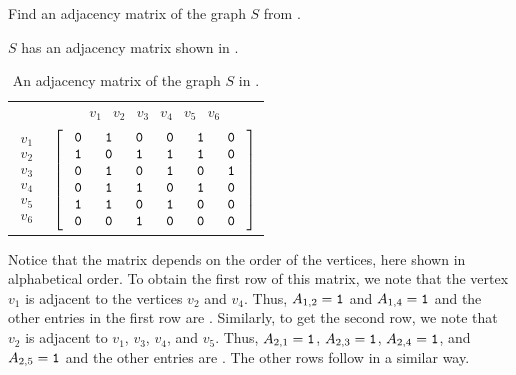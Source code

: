 \begin{exam}
\label{exam_adj_mat}
    Find an adjacency matrix of the graph $S$ from .

            \begin{soln}
                $S$ has an adjacency matrix shown in .  
            
            \begin{table}[hbtp]
                \centering
                \begin{tabular} {cc}
                    & $\begin{array} {cccccc} v_1&v_2&v_3&v_4&v_5&v_6 \end{array}$ \\ 
                    $\begin{array}{r} v_1 \\ v_2 \\ v_3 \\ v_4 \\ v_5 \\ v_6 \end{array}$  
                    & $\left[ \begin{array} {cccccc} 
                    ~\texttt{0}~ & ~\texttt{1}~ & ~\texttt{0}~ & ~\texttt{0}~ & ~\texttt{1}~ & ~\texttt{0}~\\
                    \texttt{1} & \texttt{0} & \texttt{1} & \texttt{1} & \texttt{1} & \texttt{0}\\
                    \texttt{0} & \texttt{1} & \texttt{0} & \texttt{1} & \texttt{0} & \texttt{1}\\
                    \texttt{0} & \texttt{1} & \texttt{1} & \texttt{0} & \texttt{1} & \texttt{0}\\
                    \texttt{1} & \texttt{1} & \texttt{0} & \texttt{1} & \texttt{0} & \texttt{0}\\
                    \texttt{0} & \texttt{0} & \texttt{1} & \texttt{0} & \texttt{0} & \texttt{0}\\
                    \end{array} \right]$ \\
                \end{tabular}
                \caption{An adjacency matrix of the graph $S$ in .}
                \label{table_adj_matrix}
            \end{table}

            Notice that the matrix depends on the order of the vertices, here shown in alphabetical order. To obtain the first row of this matrix, we note that the vertex $v_1$ is adjacent to the vertices $v_2$ and $v_4$.  Thus, $A_{1,2}=\texttt{1}$ and $A_{1,4}=\texttt{1}$ and the other entries in the first row are .  Similarly, to get the second row, we note that $v_2$ is adjacent to $v_1$, $v_3$, $v_4$, and $v_5$.  Thus, $A_{2,1}=\texttt{1}$, $A_{2,3}=\texttt{1}$, $A_{2,4}=\texttt{1}$, and $A_{2,5}=\texttt{1}$ and the other entries are .  The other rows follow in a similar way. 
        \end{soln}
\end{exam}


